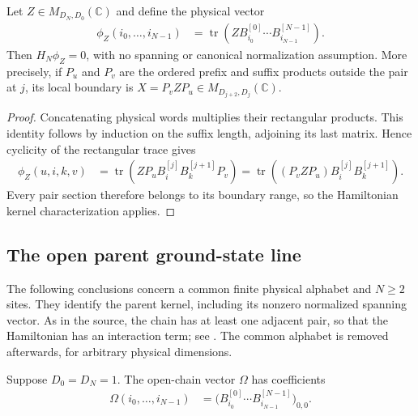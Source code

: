 \begin{lemma}
    \label{lem:varying_obc_boundary_states_parent_kernel}
    \leanok
    Let $Z\in M_{D_N,D_0}(\mathbb C)$ and define the physical vector
    \begin{align}
        \phi_Z(i_0,\ldots,i_{N-1})
         & =\operatorname{tr}(ZB^{[0]}_{i_0}\cdots B^{[N-1]}_{i_{N-1}}).
    \end{align}
    Then $H_N\phi_Z=0$, with no spanning or canonical normalization assumption.
    More precisely, if $P_u$ and $P_v$ are the ordered prefix and suffix
    products outside the pair at $j$, its local boundary is
    $X=P_v ZP_u\in M_{D_{j+2},D_j}(\mathbb C)$.
\end{lemma}
\begin{proof}\leanok
    Concatenating physical words multiplies their rectangular products.
    This identity follows by induction on the suffix length, adjoining its
    last matrix. Hence cyclicity of the rectangular trace gives
    \begin{align}
        \phi_Z(u,i,k,v)
         & =\operatorname{tr}(ZP_uB^{[j]}_iB^{[j+1]}_kP_v)
        =\operatorname{tr}((P_vZP_u)B^{[j]}_iB^{[j+1]}_k).
    \end{align}
    Every pair section therefore belongs to its boundary range, so the
    Hamiltonian kernel characterization applies.
\end{proof}


\subsection{The open parent ground-state line}

The following conclusions concern a common finite physical alphabet and
$N\ge2$ sites. They identify the parent kernel, including its nonzero
normalized spanning vector. As in the source, the chain has at least one
adjacent pair, so that the Hamiltonian has an interaction term; see
\cite{gap:pgvwc07_open_parent_domain}. The common alphabet is removed
afterwards, for arbitrary physical dimensions.

\begin{definition}
    \label{def:varying_obc_scalar_state}
    \leanok
    Suppose $D_0=D_N=1$. The open-chain vector $\Omega$ has coefficients
    \begin{align}
        \Omega(i_0,\ldots,i_{N-1})
         & =\bigl(B^{[0]}_{i_0}\cdots B^{[N-1]}_{i_{N-1}}\bigr)_{0,0}.
    \end{align}
\end{definition}

